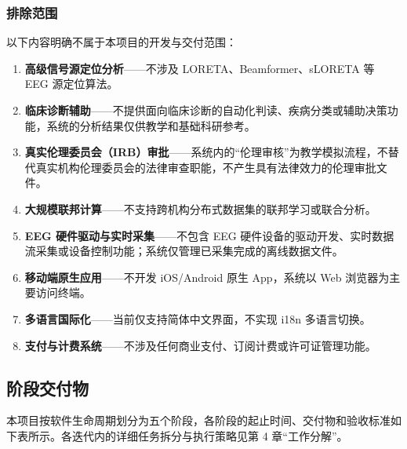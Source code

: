 \subsubsection{排除范围}

以下内容明确不属于本项目的开发与交付范围：

\begin{enumerate}
  \item \textbf{高级信号源定位分析}——不涉及 LORETA、Beamformer、sLORETA 等 EEG 源定位算法。
  \item \textbf{临床诊断辅助}——不提供面向临床诊断的自动化判读、疾病分类或辅助决策功能，系统的分析结果仅供教学和基础科研参考。
  \item \textbf{真实伦理委员会（IRB）审批}——系统内的“伦理审核”为教学模拟流程，不替代真实机构伦理委员会的法律审查职能，不产生具有法律效力的伦理审批文件。
  \item \textbf{大规模联邦计算}——不支持跨机构分布式数据集的联邦学习或联合分析。
  \item \textbf{EEG 硬件驱动与实时采集}——不包含 EEG 硬件设备的驱动开发、实时数据流采集或设备控制功能；系统仅管理已采集完成的离线数据文件。
  \item \textbf{移动端原生应用}——不开发 iOS/Android 原生 App，系统以 Web 浏览器为主要访问终端。
  \item \textbf{多语言国际化}——当前仅支持简体中文界面，不实现 i18n 多语言切换。
  \item \textbf{支付与计费系统}——不涉及任何商业支付、订阅计费或许可证管理功能。
\end{enumerate}

\subsection{阶段交付物}

本项目按软件生命周期划分为五个阶段，各阶段的起止时间、交付物和验收标准如下表所示。各迭代内的详细任务拆分与执行策略见第 4 章“工作分解”。

